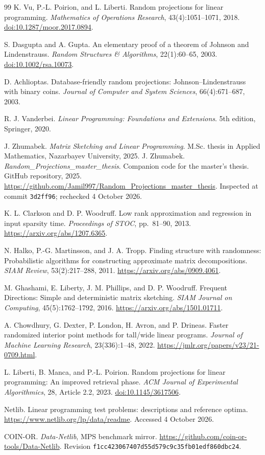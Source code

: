 \documentclass[12pt,letterpaper,oneside]{report}
\theoremstyle{definition}
\begin{document}
\begin{thebibliography}{99}
K. Vu, P.-L. Poirion, and L. Liberti.
Random projections for linear programming.
\emph{Mathematics of Operations Research}, 43(4):1051--1071, 2018.
\href{https://doi.org/10.1287/moor.2017.0894}{doi:10.1287/moor.2017.0894}.

S. Dasgupta and A. Gupta.
An elementary proof of a theorem of Johnson and Lindenstrauss.
\emph{Random Structures \& Algorithms}, 22(1):60--65, 2003.
\href{https://doi.org/10.1002/rsa.10073}{doi:10.1002/rsa.10073}.

D. Achlioptas.
Database-friendly random projections: Johnson--Lindenstrauss with binary coins.
\emph{Journal of Computer and System Sciences}, 66(4):671--687, 2003.

R. J. Vanderbei.
\emph{Linear Programming: Foundations and Extensions}.
5th edition, Springer, 2020.

J. Zhumabek.
\emph{Matrix Sketching and Linear Programming}.
M.Sc. thesis in Applied Mathematics, Nazarbayev University, 2025.
J. Zhumabek.
\emph{Random\_Projections\_master\_thesis}.
Companion code for the master's thesis. GitHub repository, 2025.
\url{https://github.com/Jamil997/Random_Projections_master_thesis}.
Inspected at commit \texttt{3d2ff96}; rechecked 4 October 2026.

K. L. Clarkson and D. P. Woodruff.
Low rank approximation and regression in input sparsity time.
\emph{Proceedings of STOC}, pp.~81--90, 2013.
\url{https://arxiv.org/abs/1207.6365}.

N. Halko, P.-G. Martinsson, and J. A. Tropp.
Finding structure with randomness: Probabilistic algorithms for
constructing approximate matrix decompositions.
\emph{SIAM Review}, 53(2):217--288, 2011.
\url{https://arxiv.org/abs/0909.4061}.

M. Ghashami, E. Liberty, J. M. Phillips, and D. P. Woodruff.
Frequent Directions: Simple and deterministic matrix sketching.
\emph{SIAM Journal on Computing}, 45(5):1762--1792, 2016.
\url{https://arxiv.org/abs/1501.01711}.

A. Chowdhury, G. Dexter, P. London, H. Avron, and P. Drineas.
Faster randomized interior point methods for tall/wide linear programs.
\emph{Journal of Machine Learning Research}, 23(336):1--48, 2022.
\url{https://jmlr.org/papers/v23/21-0709.html}.

L. Liberti, B. Manca, and P.-L. Poirion.
Random projections for linear programming: An improved retrieval phase.
\emph{ACM Journal of Experimental Algorithmics}, 28, Article 2.2, 2023.
\href{https://doi.org/10.1145/3617506}{doi:10.1145/3617506}.

Netlib. Linear programming test problems: descriptions and reference optima.
\url{https://www.netlib.org/lp/data/readme}. Accessed 4 October 2026.

COIN-OR. \emph{Data-Netlib}, MPS benchmark mirror.
\url{https://github.com/coin-or-tools/Data-Netlib}.
Revision \texttt{f1cc423067407d55d579c9c35fb01edf860dbc24}.
\end{thebibliography}
\end{document}
